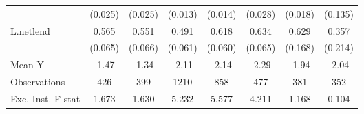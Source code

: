 {\begin{tabular}{l*{7}{c}}
            &     (0.025)         &     (0.025)         &     (0.013)         &     (0.014)         &     (0.028)         &     (0.018)         &     (0.135)         \\
\addlinespace
L.netlend   &       0.565\sym{***}&       0.551\sym{***}&       0.491\sym{***}&       0.618\sym{***}&       0.634\sym{***}&       0.629\sym{***}&       0.357\sym{*}  \\
            &     (0.065)         &     (0.066)         &     (0.061)         &     (0.060)         &     (0.065)         &     (0.168)         &     (0.214)         \\
\midrule
Mean Y      &       -1.47         &       -1.34         &       -2.11         &       -2.14         &       -2.29         &       -1.94         &       -2.04         \\
Observations&         426         &         399         &        1210         &         858         &         477         &         381         &         352         \\
Exc. Inst. F-stat&       1.673         &       1.630         &       5.232         &       5.577         &       4.211         &       1.168         &       0.104         \\
\bottomrule
\end{tabular}
}
